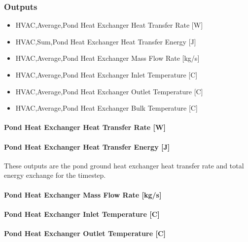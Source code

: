\subsubsection{Outputs}\label{outputs-12-000}

\begin{itemize}
\item
  HVAC,Average,Pond Heat Exchanger Heat Transfer Rate {[}W{]}
\item
  HVAC,Sum,Pond Heat Exchanger Heat Transfer Energy {[}J{]}
\item
  HVAC,Average,Pond Heat Exchanger Mass Flow Rate {[}kg/s{]}
\item
  HVAC,Average,Pond Heat Exchanger Inlet Temperature {[}C{]}
\item
  HVAC,Average,Pond Heat Exchanger Outlet Temperature {[}C{]}
\item
  HVAC,Average,Pond Heat Exchanger Bulk Temperature {[}C{]}
\end{itemize}

\paragraph{Pond Heat Exchanger Heat Transfer Rate {[}W{]}}\label{pond-heat-exchanger-heat-transfer-rate-w}

\paragraph{Pond Heat Exchanger Heat Transfer Energy {[}J{]}}\label{pond-heat-exchanger-heat-transfer-energy-j}

These outputs are the pond ground heat exchanger heat transfer rate and total energy exchange for the timestep.

\paragraph{Pond Heat Exchanger Mass Flow Rate {[}kg/s{]}}\label{pond-heat-exchanger-mass-flow-rate-kgs}

\paragraph{Pond Heat Exchanger Inlet Temperature {[}C{]}}\label{pond-heat-exchanger-inlet-temperature-c}

\paragraph{Pond Heat Exchanger Outlet Temperature {[}C{]}}\label{pond-heat-exchanger-outlet-temperature-c}

